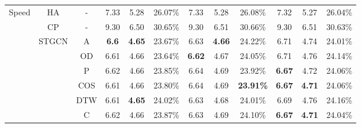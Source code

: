 \begin{table}[t!]
\begin{center}
{\begin{tabular}{c|c|c|ccc|ccc|ccc}
                \multirow{23}{*}{Speed}        & HA                     & -     & 7.33                                  & 5.28                                  & 26.07\%                               & 7.33          & 5.28          & 26.08\%          & 7.32          & 5.27          & 26.04\%          \\
                                               & CP                     & -     & 9.30                                  & 6.50                                  & 30.65\%                               & 9.30          & 6.51          & 30.66\%          & 9.30          & 6.51          & 30.63\%          \\
                \cline{2-12}
                                               & \multirow{7}{*}{STGCN} & A     & \textbf{6.6}                          & \textbf{4.65}                         & 23.67\%                               & 6.63          & \textbf{4.66} & 24.22\%          & 6.71          & 4.74          & 24.01\%          \\
                                               &                        & OD    & 6.61                                  & 4.66                                  & 23.64\%                               & \textbf{6.62} & 4.67          & 24.05\%          & 6.71          & 4.76          & 24.14\%          \\
                                               &                        & P     & 6.62                                  & 4.66                                  & 23.85\%                               & 6.64          & 4.69          & 23.92\%          & \textbf{6.67} & 4.72          & 24.06\%          \\
                                               &                        & COS   & 6.61                                  & 4.66                                  & 23.80\%                               & 6.64          & 4.69          & \textbf{23.91\%} & \textbf{6.67} & \textbf{4.71} & 24.06\%          \\
                                               &                        & DTW   & 6.61                                  & \textbf{4.65}                         & 24.02\%                               & 6.63          & 4.68          & 24.01\%          & 6.69          & 4.76          & 24.16\%          \\
                                               &                        & C     & 6.62                                  & 4.66                                  & 23.87\%                               & 6.63          & 4.69          & 24.10\%          & \textbf{6.67} & \textbf{4.71} & 24.04\%          \\

\end{tabular}}
\end{center}
\end{table}
